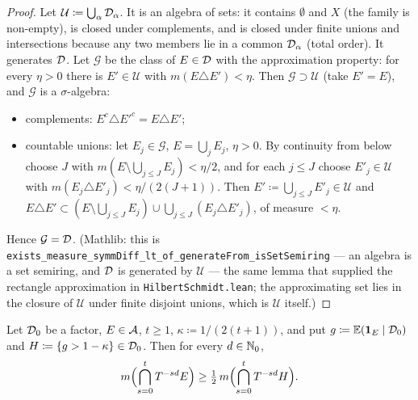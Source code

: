 \begin{proof}
  Let $\mathcal U \coloneqq \bigcup_\alpha \mathcal{D}_\alpha$.  It is an algebra of sets: it contains
  $\emptyset$ and $X$ (the family is non-empty), is closed under complements, and is closed
  under finite unions and intersections because any two members lie in a common $\mathcal{D}_\alpha$
  (total order).  It generates $\mathcal{D}$.  Let $\mathcal G$ be the class of $E \in \mathcal{D}$ with the
  approximation property: for every $\eta > 0$ there is $E' \in \mathcal U$ with
  $m(E \triangle E') < \eta$.  Then $\mathcal G \supset \mathcal U$ (take $E' = E$), and
  $\mathcal G$ is a $\sigma$-algebra:
  \begin{itemize}
    \item complements: $E^c \triangle E'^c = E \triangle E'$;
    \item countable unions: let $E_j \in \mathcal G$, $E = \bigcup_j E_j$, $\eta > 0$.  By
      continuity from below choose $J$ with $m(E \setminus \bigcup_{j \leq J}E_j) < \eta/2$,
      and for each $j \leq J$ choose $E'_j \in \mathcal U$ with
      $m(E_j \triangle E'_j) < \eta/(2(J+1))$.  Then $E' \coloneqq \bigcup_{j\leq J}E'_j \in \mathcal U$
      and $E \triangle E' \subset (E \setminus \bigcup_{j\leq J}E_j) \cup \bigcup_{j \leq J}(E_j \triangle E'_j)$,
      of measure $< \eta$.
  \end{itemize}
  Hence $\mathcal G = \mathcal{D}$.  (Mathlib: this is
  \texttt{exists\_measure\_symmDiff\_lt\_of\_generateFrom\_isSetSemiring} --- an algebra is a
  set semiring, and $\mathcal{D}$ is generated by $\mathcal U$ --- the same lemma that supplied the
  rectangle approximation in \texttt{HilbertSchmidt.lean}; the approximating set lies in the
  closure of $\mathcal U$ under finite disjoint unions, which is $\mathcal U$ itself.)
\end{proof}

\begin{lemma}
  \label{lem:chain-comparison}
  \leanok
  Let $\mathcal{D}_0$ be a factor, $E \in \mathcal{A}$, $t \geq 1$, $\kappa \coloneqq 1/(2(t+1))$, and put
  $g \coloneqq \mathbb{E}(\mathbf{1}_E\mid\mathcal{D}_0)$ and $H \coloneqq \{g > 1 - \kappa\} \in \mathcal{D}_0$.  Then for
  every $d \in \mathbb{N}_0$,
  \begin{equation}
    \label{eq:chain-comparison}
    m\Bigl( \bigcap_{s=0}^{t} T^{-sd}E \Bigr) \geq \tfrac12\, m\Bigl( \bigcap_{s=0}^{t} T^{-sd}H \Bigr) .
  \end{equation}
\end{lemma}

